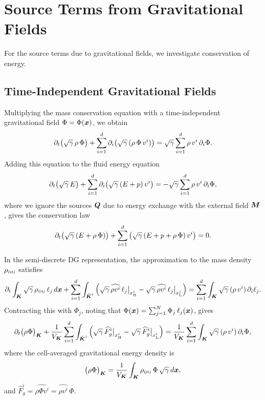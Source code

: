 \documentclass[10pt,preprint]{aastex}
\begin{document}
\section{Source Terms from Gravitational Fields}

For the source terms due to gravitational fields, we investigate conservation of energy.  

\subsection{Time-Independent Gravitational Fields}

Multiplying the mass conservation equation with a time-independent gravitational field $\Phi=\Phi(\bx)$, we obtain
\begin{equation}
  \pd{}{t}\big(\sqrt{\gamma}\,\rho\,\Phi\big)
  +\sum_{i=1}^{d}\pd{}{i}\big(\sqrt{\gamma}\,(\rho\,\Phi\,v^{i})\big)
  =\sqrt{\gamma}\sum_{i=1}^{d}\rho\,v^{i}\,\pd{\Phi}{i}.
\end{equation}
Adding this equation to the fluid energy equation 
\begin{equation}
  \pd{}{t}\big(\sqrt{\gamma}\,E\big)
  +\sum_{i=1}^{d}\pd{}{i}\big(\sqrt{\gamma}\,(E+p)\,v^{i}\big)
  =-\sqrt{\gamma}\sum_{i=1}^{d}\rho\,v^{i}\,\pd{\Phi}{i},
\end{equation}
where we ignore the sources $\bQ$ due to energy exchange with the external field $\bM$, gives the conservation law
\begin{equation}
  \pd{}{t}\big(\sqrt{\gamma}\,(E+\rho\,\Phi)\big)
  +\sum_{i=1}^{d}\big(\sqrt{\gamma}\,(E+p+\rho\,\Phi)\,v^{i}\big)
  =0.  
\end{equation}

In the semi-discrete DG representation, the approximation to the mass density $\rho_{\DG}$ satisfies
\begin{equation}
  \pd{}{t}\int_{\bK}\sqrt{\gamma}\,\rho_{\DG}\,\ell_{j}\,d\bx
  +\sum_{i=1}^{d}\int_{\tilde{\bK}^{i}}
  \Big(
    \sqrt{\gamma}\,\widehat{\rho v^{i}}\,\ell_{j}\big|_{x_{\Hgh}^{i}}
    -\sqrt{\gamma}\,\widehat{\rho v^{i}}\,\ell_{j}\big|_{x_{\Low}^{i}}
  \Big)
  =\sum_{i=1}^{d}\int_{\bK}\sqrt{\gamma}\,(\rho\,v^{i})\,\pd{\ell_{j}}{i}.  
\end{equation}
Contracting this with $\Phi_{j}$, noting that $\Phi(\bx)=\sum_{j=1}^{N}\Phi_{j}\,\ell_{j}(\bx)$, gives
\begin{equation}
  \pd{}{t}\big(\rho\Phi\big)_{\bK}
  +\f{1}{V_{\bK}}\sum_{i=1}^{d}\int_{\tilde{\bK}^{i}}
  \Big(
    \sqrt{\gamma}\,\widehat{F}_{g}^{i}\big|_{x_{\Hgh}^{i}}
    -\sqrt{\gamma}\,\widehat{F}_{g}^{i}\big|_{x_{\Low}^{i}}
  \Big)
  =\f{1}{V_{\bK}}\sum_{i=1}^{d}\int_{\bK}\sqrt{\gamma}\,(\rho\,v^{i})\,\pd{\Phi}{i},
\end{equation}
where the cell-averaged gravitational energy density is
\begin{equation}
  \big(\rho\Phi\big)_{\bK}
  =\f{1}{V_{\bK}}\int_{\bK}\rho_{\DG}\,\Phi\,\sqrt{\gamma}\,d\bx,
\end{equation}
and $\widehat{F}_{g}^{i}=\widehat{\rho \Phi v^{i}}=\widehat{\rho v^{i}}\,\Phi$.  
\end{document}
